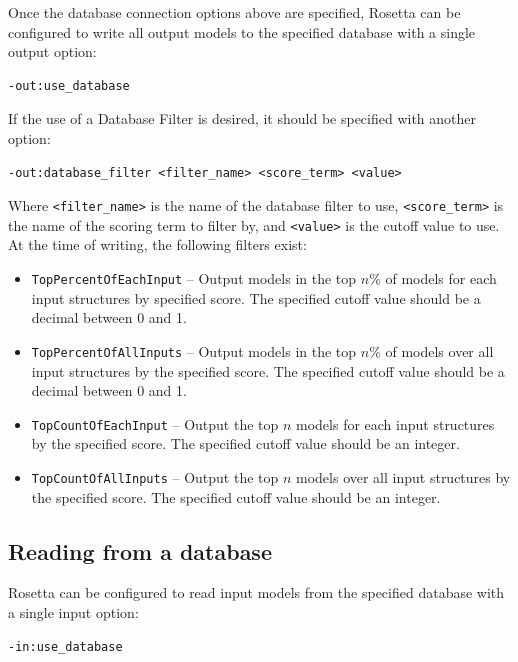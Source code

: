 Once the database connection options above are specified, Rosetta can be configured to write all output models to the specified database with a single output option:

\singlespace
\begin{Verbatim}
-out:use_database
\end{Verbatim}
\doublespace

If the use of a Database Filter is desired, it should be specified with another option:

\singlespace
\begin{Verbatim}
-out:database_filter <filter_name> <score_term> <value>
\end{Verbatim}
\doublespace

Where \texttt{<filter\_name>} is the name of the database filter to use, \texttt{<score\_term>} is the name of the scoring term to filter by, and \texttt{<value>} is the cutoff value to use. 
At the time of writing, the following filters exist:

\begin{itemize}
	\item \texttt{TopPercentOfEachInput} -- Output models in the top $n\%$ of models for each input structures by specified score.
	The specified cutoff value should be a decimal between 0 and 1. 
	\item \texttt{TopPercentOfAllInputs} -- Output models in the top $n\%$ of models over all input structures by the specified score.
	The specified cutoff value should be a decimal between 0 and 1.
	\item \texttt{TopCountOfEachInput} -- Output the top $n$ models for each input structures by the specified score.
	The specified cutoff value should be an integer.
	\item \texttt{TopCountOfAllInputs} -- Output the top $n$ models over all input structures by the specified score.
	The specified cutoff value should be an integer.
\end{itemize}

\subsection{Reading from a database}

Rosetta can be configured to read input models from the specified database with a single input option:

\singlespace
\begin{Verbatim}
-in:use_database
\end{Verbatim}
\doublespace

